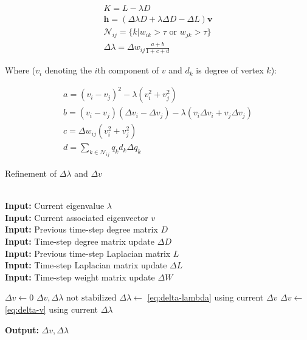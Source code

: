 \documentclass{article}
\begin{document}
\begin{align}
    K = L - \lambda D \\
    \textbf{h} = (\Delta\lambda D + \lambda \Delta D - \Delta L)\textbf{v} \\
    \mathcal{N}_{ij} = \{k|w_{ik} > \tau \text{ or } w_{jk} > \tau\} \\
    \Delta\lambda = \Delta w_{ij}\frac{a + b}{1 + c + d}\label{eq:delta-lambda}
\end{align}

Where ($v_i$ denoting the $i$th component of $v$ and $d_k$ is degree of vertex $k$):

\begin{align}
    a = (v_i - v_j)^2 - \lambda(v_i^2 + v_j^2) \\
    b = (v_i - v_j)(\Delta v_i - \Delta v_j) - \lambda(v_i\Delta v_i + v_j\Delta v_j) \\
    c = \Delta w_{ij}(v_i^2 + v_j^2) \\
    d = \sum_{k\in\mathcal{N}_{ij}} q_k d_k\Delta q_k
\end{align}

\begin{algorithm}
\caption{Refinement of $\Delta\lambda$ and $\Delta v$ \cite{incremental}}\label{alg:refinement}
\begin{algorithmic}[1]
 \\
\textbf{Input:} Current eigenvalue $\lambda$ \\
\textbf{Input:} Current associated eigenvector $v$ \\
\textbf{Input:} Previous time-step degree matrix $D$ \\
\textbf{Input:} Time-step degree matrix update $\Delta D$ \\
\textbf{Input:} Previous time-step Laplacian matrix $L$ \\
\textbf{Input:} Time-step Laplacian matrix update $\Delta L$ \\
\textbf{Input:} Time-step weight matrix update $\Delta W$

\State $\Delta v \gets 0$
\While $\Delta v, \Delta\lambda \text{ not stabilized}$
    \State $\Delta\lambda \gets$ \ref{eq:delta-lambda} using current $\Delta v$ 
    \State $\Delta v \gets$ \ref{eq:delta-v} using current $\Delta \lambda$ 
\EndWhile

\textbf{Output:} $\Delta v, \Delta\lambda$
\EndProcedure
\end{algorithmic}
\end{algorithm}
\end{document}

